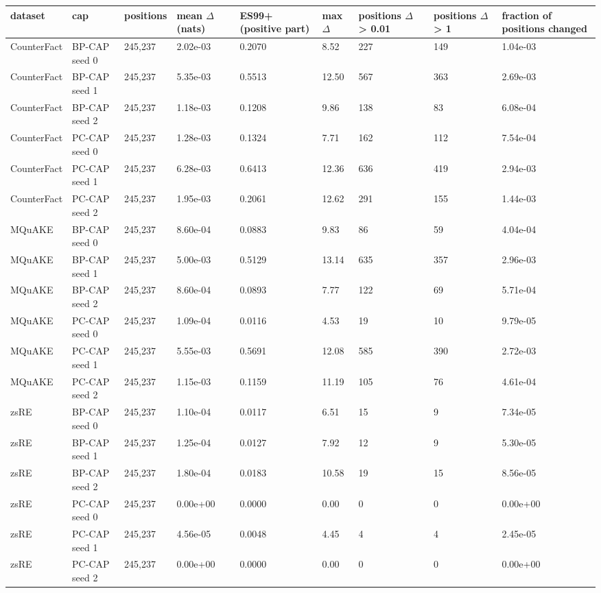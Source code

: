 \documentclass[10pt,a4paper]{article}
\begin{document}
\begin{center}\scriptsize
\begin{tabularx}{\textwidth}{@{}p{}XXXXXXXX@{}}
\toprule
dataset & cap & positions & mean $\Delta$ (nats) & ES99+ (positive part) & max $\Delta$ & positions $\Delta$ > 0.01 & positions $\Delta$ > 1 & fraction of positions changed \\ \midrule
CounterFact & BP-CAP seed 0 & 245,237 & 2.02e-03 & 0.2070 & 8.52 & 227 & 149 & 1.04e-03 \\
CounterFact & BP-CAP seed 1 & 245,237 & 5.35e-03 & 0.5513 & 12.50 & 567 & 363 & 2.69e-03 \\
CounterFact & BP-CAP seed 2 & 245,237 & 1.18e-03 & 0.1208 & 9.86 & 138 & 83 & 6.08e-04 \\
CounterFact & PC-CAP seed 0 & 245,237 & 1.28e-03 & 0.1324 & 7.71 & 162 & 112 & 7.54e-04 \\
CounterFact & PC-CAP seed 1 & 245,237 & 6.28e-03 & 0.6413 & 12.36 & 636 & 419 & 2.94e-03 \\
CounterFact & PC-CAP seed 2 & 245,237 & 1.95e-03 & 0.2061 & 12.62 & 291 & 155 & 1.44e-03 \\
MQuAKE & BP-CAP seed 0 & 245,237 & 8.60e-04 & 0.0883 & 9.83 & 86 & 59 & 4.04e-04 \\
MQuAKE & BP-CAP seed 1 & 245,237 & 5.00e-03 & 0.5129 & 13.14 & 635 & 357 & 2.96e-03 \\
MQuAKE & BP-CAP seed 2 & 245,237 & 8.60e-04 & 0.0893 & 7.77 & 122 & 69 & 5.71e-04 \\
MQuAKE & PC-CAP seed 0 & 245,237 & 1.09e-04 & 0.0116 & 4.53 & 19 & 10 & 9.79e-05 \\
MQuAKE & PC-CAP seed 1 & 245,237 & 5.55e-03 & 0.5691 & 12.08 & 585 & 390 & 2.72e-03 \\
MQuAKE & PC-CAP seed 2 & 245,237 & 1.15e-03 & 0.1159 & 11.19 & 105 & 76 & 4.61e-04 \\
zsRE & BP-CAP seed 0 & 245,237 & 1.10e-04 & 0.0117 & 6.51 & 15 & 9 & 7.34e-05 \\
zsRE & BP-CAP seed 1 & 245,237 & 1.25e-04 & 0.0127 & 7.92 & 12 & 9 & 5.30e-05 \\
zsRE & BP-CAP seed 2 & 245,237 & 1.80e-04 & 0.0183 & 10.58 & 19 & 15 & 8.56e-05 \\
zsRE & PC-CAP seed 0 & 245,237 & 0.00e+00 & 0.0000 & 0.00 & 0 & 0 & 0.00e+00 \\
zsRE & PC-CAP seed 1 & 245,237 & 4.56e-05 & 0.0048 & 4.45 & 4 & 4 & 2.45e-05 \\
zsRE & PC-CAP seed 2 & 245,237 & 0.00e+00 & 0.0000 & 0.00 & 0 & 0 & 0.00e+00 \\
\bottomrule
\end{tabularx}
\end{center}
\end{document}

